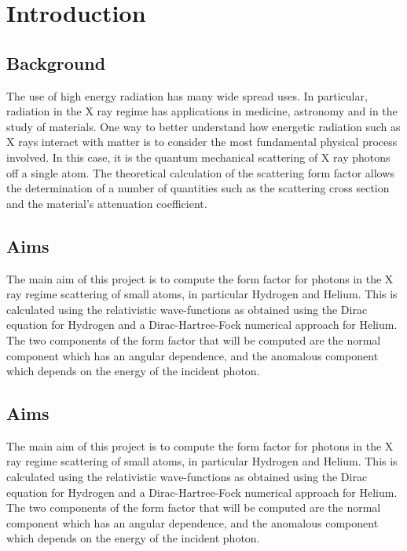 \chapter{Introduction}
\section{Background}
The use of high energy radiation has many wide spread uses. In
particular, radiation in the X ray regime has applications in medicine,
astronomy and in the study of materials. 
One way to better understand how energetic radiation such as X rays
interact with matter is to consider the most fundamental physical
process involved. In this case, it is the quantum mechanical scattering
of X ray photons off a single atom.
The theoretical calculation of the scattering form factor allows the
determination of a number of quantities such as the scattering cross
section and the material's attenuation coefficient. 

\section{Aims}
The main aim of this project is to compute the form factor for photons
in the X ray regime scattering of small atoms, in particular Hydrogen
and Helium. This is calculated using the relativistic wave-functions as
obtained using the Dirac equation for Hydrogen and a Dirac-Hartree-Fock
numerical approach for Helium. The two components of the form factor
that will be computed are the normal component which has an angular
dependence, and the anomalous component which depends on the energy of
the incident photon.

\section{Aims}
The main aim of this project is to compute the form factor for photons
in the X ray regime scattering of small atoms, in particular Hydrogen
and Helium. This is calculated using the relativistic wave-functions as
obtained using the Dirac equation for Hydrogen and a Dirac-Hartree-Fock
numerical approach for Helium. The two components of the form factor
that will be computed are the normal component which has an angular
dependence, and the anomalous component which depends on the energy of
the incident photon.

